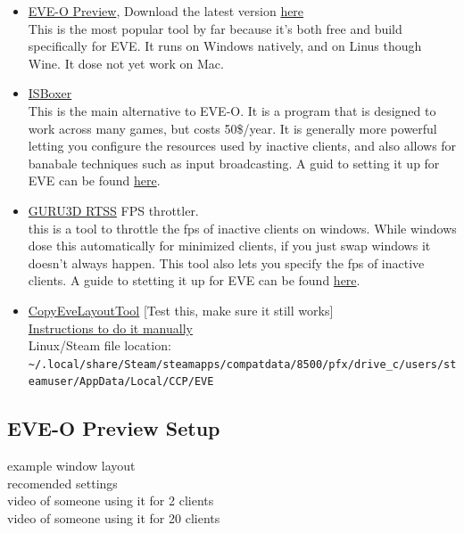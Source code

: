 \documentclass{article}
\begin{document}
\begin{itemize}
  \item \href{https://github.com/Proopai/eve-o-preview}{EVE-O Preview}, Download the latest version \href{https://github.com/Proopai/eve-o-preview/releases}{here} \\
        This is the most popular tool by far because it's both free and build specifically for EVE. It runs on Windows natively, and on Linus
        though Wine. It dose not yet work on Mac.
  \item \href{https://isboxer.com/}{ISBoxer} \\
        This is the main alternative to EVE-O. It is a program that is designed to work across many games, but costs 50\$/year. It
        is generally more powerful letting you configure the resources used by inactive clients, and also allows for banabale techniques
        such as input broadcasting. A guid to setting it up for EVE can be found \href{https://isboxer.com/wiki/EVE:Quick_Start_Guide}{here}.
  \item \href{https://www.guru3d.com/download/rtss-rivatuner-statistics-server-download}{GURU3D RTSS} FPS throttler.\\
        this is a tool to throttle the fps of inactive clients on windows. While windows dose this automatically for minimized clients, if you
        just swap windows it doesn't always happen. This tool also lets you specify the fps of inactive clients. A guide to stetting it up
        for EVE can be found \href{https://www.youtube.com/watch?v=R7YdEPDD_08}{here}.
  \item \href{https://github.com/kshannoninnes/CopyEveLayoutTool}{CopyEveLayoutTool} [Test this, make sure it still works] \\
        \href{https://forums.eveonline.com/t/manually-copy-settings-between-characters-and-accounts/32704}{Instructions to do it manually} \\
        Linux/Steam file location: \lstinline{~/.local/share/Steam/steamapps/compatdata/8500/pfx/drive_c/users/steamuser/AppData/Local/CCP/EVE} \\
\end{itemize}

\clearpage
\subsection{EVE-O Preview Setup}
example window layout \\
recomended settings \\
video of someone using it for 2 clients \\
video of someone using it for 20 clients \\
\end{document}
